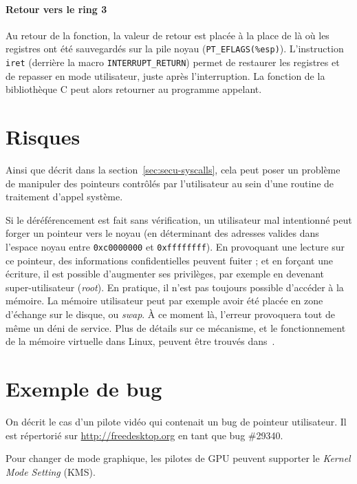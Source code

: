 \paragraph{Retour vers le ring 3}

Au retour de la fonction, la valeur de retour est placée à la place de \eax{} là
où les registres ont été sauvegardés sur la pile noyau
(\texttt{PT\_EFLAGS(\%esp)}). %
L'instruction \texttt{iret} (derrière la macro
\texttt{INTERRUPT\_RETURN}) permet de restaurer les registres et de repasser en
mode utilisateur, juste après l'interruption. La fonction de la bibliothèque C
peut alors retourner au programme appelant.

\section{Risques}

Ainsi que décrit dans la section~\ref{sec:secu-syscalls}, cela peut poser un
problème de manipuler des pointeurs contrôlés par l'utilisateur au sein d'une
routine de traitement d'appel système.

Si le déréférencement est fait sans vérification, un utilisateur mal intentionné
peut forger un pointeur vers le noyau (en déterminant des adresses valides dans
l'espace noyau entre \texttt{0xc0000000} et \texttt{0xffffffff}). En provoquant
une lecture sur ce pointeur, des informations confidentielles peuvent fuiter ;
et en forçant une écriture, il est possible d'augmenter ses privilèges, par
exemple en devenant super-utilisateur (\emph{root}). En pratique, il n'est pas
toujours possible d'accéder à la mémoire. La mémoire utilisateur peut par
exemple avoir été placée en zone d'échange sur le disque, ou \emph{swap}. À ce
moment là, l'erreur provoquera tout de même un déni de service. Plus de détails
sur ce mécanisme, et le fonctionnement de la mémoire virtuelle dans Linux,
peuvent être trouvés dans~\cite{userspaceaccess}.

\section{Exemple de bug}

On décrit le cas d'un pilote vidéo qui contenait un bug de pointeur utilisateur.
Il est répertorié sur \url{http://freedesktop.org} en tant que bug \#29340.

Pour changer de mode graphique, les pilotes de GPU peuvent supporter le
\emph{Kernel Mode Setting} (KMS).


